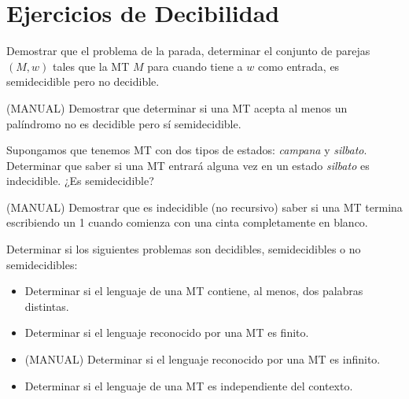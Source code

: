 \chapter{Ejercicios de Decibilidad}

\setcounter{ejercicio}{7}


\begin{ejercicio}
    Demostrar que el problema de la parada, determinar el conjunto de parejas $(M, w)$ tales
    que la MT $M$ para cuando tiene a $w$ como entrada, es semidecidible pero no decidible.
\end{ejercicio}


\begin{ejercicio}
    (MANUAL) Demostrar que determinar si una MT acepta al menos un palíndromo no es
    decidible pero sí semidecidible.
\end{ejercicio}


\begin{ejercicio}
    Supongamos que tenemos MT con dos tipos de estados: \textit{campana} y \textit{silbato}. Determinar que saber si una MT entrará alguna vez en un estado \textit{silbato} es indecidible. ¿Es semidecidible?
\end{ejercicio}


\begin{ejercicio}
    (MANUAL) Demostrar que es indecidible (no recursivo) saber si una MT termina escribiendo un 1 cuando comienza con una cinta completamente en blanco.
\end{ejercicio}


\begin{ejercicio}
    Determinar si los siguientes problemas son decidibles, semidecidibles o no semidecidibles:
    \begin{itemize}
        \item[a)] Determinar si el lenguaje de una MT contiene, al menos, dos palabras distintas.
        \item[b)] Determinar si el lenguaje reconocido por una MT es finito.
        \item[c)] (MANUAL) Determinar si el lenguaje reconocido por una MT es infinito.
        \item[d)] Determinar si el lenguaje de una MT es independiente del contexto.
    \end{itemize}
\end{ejercicio}

